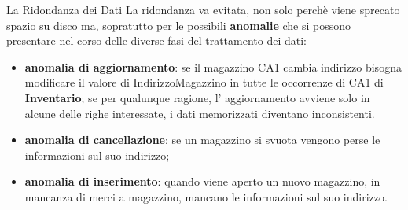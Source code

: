%
\begin{frame}{La Ridondanza dei Dati}
La ridondanza va evitata, non solo perch\`e viene sprecato spazio su disco ma, sopratutto per le possibili \textbf{anomalie} che si possono presentare nel corso delle diverse fasi del trattamento dei dati:
\pause
\begin{itemize}[<+->]
    \item \textbf{anomalia di aggiornamento}: se il magazzino CA1 cambia indirizzo bisogna modificare il valore di IndirizzoMagazzino in tutte le occorrenze di CA1 di \textbf{Inventario}; se per qualunque ragione, l' aggiornamento avviene solo in alcune delle righe interessate, i dati memorizzati diventano inconsistenti.
    \item \textbf{anomalia di cancellazione}: se un magazzino si svuota vengono perse le informazioni sul suo indirizzo;
    \item \textbf{anomalia di inserimento}: quando viene aperto un nuovo magazzino, in mancanza di merci a magazzino, mancano le informazioni sul suo indirizzo.
\end{itemize}
\end{frame}
%
